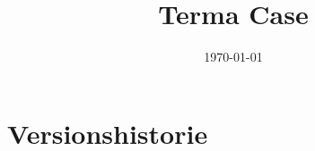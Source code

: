 \documentclass[oneside, 12pt]{memoir}
\title{Terma Case}
\date{\today}
\begin{document}
\maketitle
%	


\section*{Versionshistorie}


\newpage
\tableofcontents* %
\newpage
\listoffigures* %

\listoffixmes

\newpage



\appendix



\end{document}
